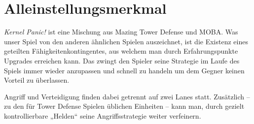 \section{Alleinstellungsmerkmal}


\textit{Kernel Panic!} ist eine Mischung aus Mazing Tower Defense und MOBA.
Was unser Spiel von den anderen ähnlichen Spielen auszeichnet, ist die Existenz
eines geteilten Fähigkeitenkontingentes, aus welchem man durch Erfahrungspunkte Upgrades erreichen kann. Das zwingt den Spieler seine Strategie im Laufe des Spiels immer wieder anzupassen und schnell zu handeln um dem Gegner keinen Vorteil zu überlassen.

Angriff und Verteidigung finden dabei getrennt auf zwei Lanes statt.
Zusätzlich -- zu den für Tower Defense Spielen üblichen Einheiten -- kann man, durch gezielt kontrollierbare „Helden“ seine Angriffsstrategie weiter verfeinern.
